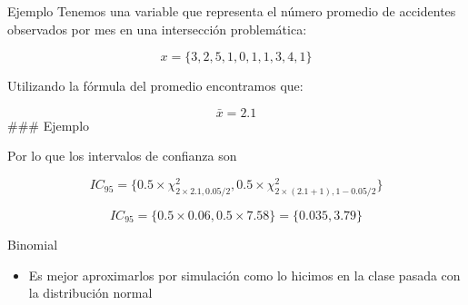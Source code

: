 \documentclass[
  11pt,
  ignorenonframetext,
]{beamer}
\providecommand{\tightlist}{%
  \setlength{\itemsep}{0pt}\setlength{\parskip}{0pt}}
\begin{document}
\begin{frame}{Ejemplo}
\protect\hypertarget{ejemplo}{}
Tenemos una variable que representa el número promedio de accidentes
observados por mes en una intersección problemática:

\[x = \{3, 2, 5, 1, 0, 1, 1, 3, 4, 1\}\]

Utilizando la fórmula del promedio encontramos que:

\[\bar{x} = 2.1\] \#\#\# Ejemplo

Por lo que los intervalos de confianza son

\[IC_{95} = \{ 0.5 \times \chi^2_{2 \times 2.1, 0.05/2}, 0.5 \times \chi^2_{2 \times (2.1 + 1), 1-0.05/2} \}\]

\[IC_{95} = \{0.5 \times 0.06, 0.5 \times 7.58 \}= \{0.035, 3.79 \}\]
\end{frame}

\begin{frame}{Binomial}
\protect\hypertarget{binomial-1}{}
\begin{itemize}
\tightlist
\item
  Es mejor aproximarlos por simulación como lo hicimos en la clase
  pasada con la distribución normal
\end{itemize}
\end{frame}
\end{document}
